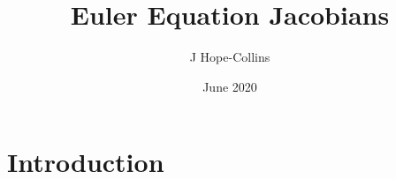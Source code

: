 \documentclass{article}
\title{Euler Equation Jacobians}
\author{J Hope-Collins}
\date{June 2020}
\begin{document}
\maketitle

\section{Introduction}
\end{document}
